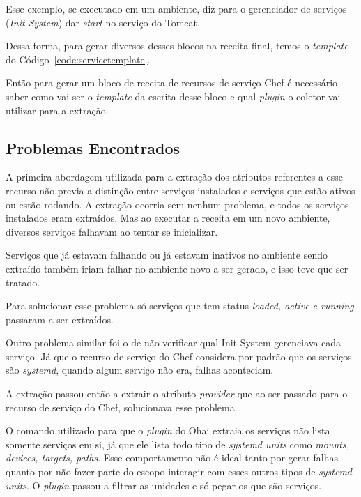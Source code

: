 Esse exemplo, se executado em um ambiente, diz para o
gerenciador de serviços (\textit{Init System}) dar \textit{start} no serviço do Tomcat.

Dessa forma, para gerar diversos desses blocos na receita final, temos o \textit{template}
do Código~\ref{code:servicetemplate}.

\noindent\begin{minipage}{\textwidth}
  \lstset{style=shell}
  
\end{minipage}\hfill

Então para gerar um bloco de receita de recursos de serviço Chef é necessário
saber como vai ser o \textit{template} da escrita desse bloco e qual \textit{plugin} o
coletor vai utilizar para a extração.

\subsection{Problemas Encontrados}

A primeira abordagem utilizada para a extração dos atributos referentes a esse
recurso não previa a distinção entre serviços instalados e serviços que estão
ativos ou estão rodando. A extração ocorria sem nenhum problema, e todos os serviços
instalados eram extraídos. Mas ao executar a receita em um novo ambiente, diversos
serviços falhavam ao tentar se inicializar.

Serviços que já estavam falhando ou já estavam inativos no ambiente sendo extraído
também iriam falhar no ambiente novo a ser gerado, e isso teve que ser tratado.


Para solucionar esse problema só serviços que tem status \textit{loaded, active e running}
passaram a ser extraídos.\

Outro problema similar foi o de não verificar qual Init System gerenciava cada
serviço. Já que o recurso de serviço do Chef considera por padrão que os serviços
são \textit{systemd}, quando algum serviço não era, falhas aconteciam.

A extração passou então a extrair o atributo \textit{provider} que ao ser passado
para o recurso de serviço do Chef, solucionava esse problema.

O comando utilizado para que o \textit{plugin} do Ohai extraia os serviços não
lista somente serviços em si, já que ele lista todo tipo de \textit{systemd units}
como \textit{mounts, devices, targets, paths}. Esse comportamento não é ideal
tanto por gerar falhas quanto por não fazer parte do escopo interagir com esses
outros tipos de \textit{systemd units}. O \textit{plugin} passou a filtrar as
unidades e só pegar os que são serviços.

